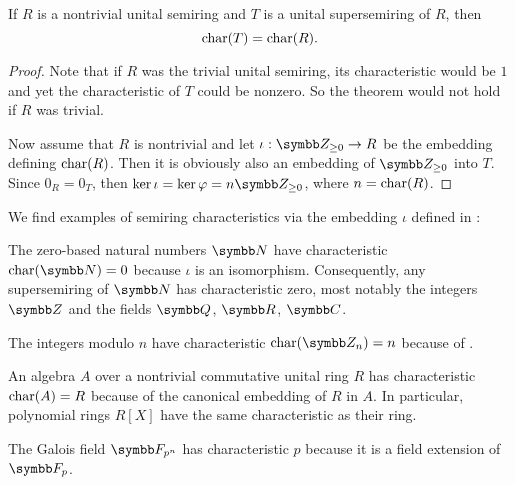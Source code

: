 \begin{proposition}\label{thm:embedding_preserves_characteristic}
  If \( R \) is a nontrivial unital semiring and \( T \) is a unital supersemiring of \( R \), then
  \begin{equation*}
    \operatorname{char}(T) = \operatorname{char}(R).
  \end{equation*}
\end{proposition}
\begin{proof}
  Note that if \( R \) was the trivial unital semiring, its characteristic would be \( 1 \) and yet the characteristic of \( T \) could be nonzero. So the theorem would not hold if \( R \) was trivial.

  Now assume that \( R \) is nontrivial and let \( \iota: \BZ_{\geq 0} \to R \) be the embedding defining \( \operatorname{char}(R) \). Then it is obviously also an embedding of \( \BZ_{\geq 0} \) into \( T \). Since \( 0_R = 0_T \), then \( \ker \iota = \ker \varphi = n\BZ_{\geq 0} \), where \( n = \operatorname{char}(R) \).
\end{proof}

\begin{example}\label{ex:semiring_characteristic}
  We find examples of semiring characteristics via the embedding \( \iota \) defined in :

  \begin{exenum}
     The zero-based natural numbers \( \BN \) have characteristic \( \Char(\BN) = 0 \) because \( \iota \) is an isomorphism. Consequently, any supersemiring of \( \BN \) has characteristic zero, most notably the integers \( \BZ \) and the fields \( \BQ \), \( \BR \), \( \BC \).

     The integers modulo \( n \) have characteristic \( \Char(\BZ_n) = n \) because of .

     An algebra \( A \) over a nontrivial commutative unital ring \( R \) has characteristic \( \operatorname{char}(A) = R \) because of the canonical embedding of \( R \) in \( A \). In particular, polynomial rings \( R[X] \) have the same characteristic as their ring.

     The Galois field \( \BF_{p^n} \) has characteristic \( p \) because it is a field extension of \( \BF_p \).
  \end{exenum}
\end{example}


